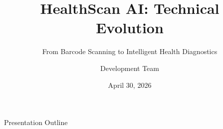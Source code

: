 \documentclass{beamer}
\title{HealthScan AI: Technical Evolution}
\subtitle{From Barcode Scanning to Intelligent Health Diagnostics}
\author{Development Team}
\date{April 30, 2026}
\begin{document}
\begin{frame}
    \titlepage
\end{frame}

\begin{frame}{Presentation Outline}
    \tableofcontents
\end{frame}






\end{document}
